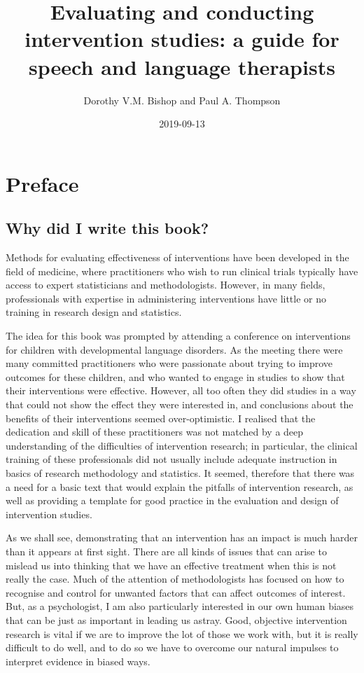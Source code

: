 \documentclass[]{book}
\title{Evaluating and conducting intervention studies: a guide for speech and language therapists}
\author{Dorothy V.M. Bishop and Paul A. Thompson}
\date{2019-09-13}
\begin{document}
\maketitle

{
\setcounter{tocdepth}{1}
\tableofcontents
}
\hypertarget{preface}{%
\chapter*{Preface}\label{preface}}

\hypertarget{why-did-i-write-this-book}{%
\section*{Why did I write this book?}\label{why-did-i-write-this-book}}

Methods for evaluating effectiveness of interventions have been developed in the field of medicine, where practitioners who wish to run clinical trials typically have access to expert statisticians and methodologists. However, in many fields, professionals with expertise in administering interventions have little or no training in research design and statistics.

The idea for this book was prompted by attending a conference on interventions for children with developmental language disorders. As the meeting there were many committed practitioners who were passionate about trying to improve outcomes for these children, and who wanted to engage in studies to show that their interventions were effective. However, all too often they did studies in a way that could not show the effect they were interested in, and conclusions about the benefits of their interventions seemed over-optimistic. I realised that the dedication and skill of these practitioners was not matched by a deep understanding of the difficulties of intervention research; in particular, the clinical training of these professionals did not usually include adequate instruction in basics of research methodology and statistics. It seemed, therefore that there was a need for a basic text that would explain the pitfalls of intervention research, as well as providing a template for good practice in the evaluation and design of intervention studies.

As we shall see, demonstrating that an intervention has an impact is much harder than it appears at first sight. There are all kinds of issues that can arise to mislead us into thinking that we have an effective treatment when this is not really the case. Much of the attention of methodologists has focused on how to recognise and control for unwanted factors that can affect outcomes of interest. But, as a psychologist, I am also particularly interested in our own human biases that can be just as important in leading us astray. Good, objective intervention research is vital if we are to improve the lot of those we work with, but it is really difficult to do well, and to do so we have to overcome our natural impulses to interpret evidence in biased ways.
\end{document}
